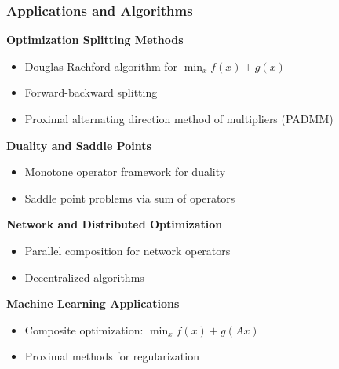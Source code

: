\documentclass[aspectratio=169,10pt]{beamer}
\begin{document}
\begin{frame}
  \frametitle{Applications and Algorithms}

  \textbf{Optimization Splitting Methods}
  \begin{itemize}
    \item Douglas-Rachford algorithm for $\min_x f(x) + g(x)$
    \item Forward-backward splitting
    \item Proximal alternating direction method of multipliers (PADMM)
  \end{itemize}

  \vspace{0.3cm}

  \textbf{Duality and Saddle Points}
  \begin{itemize}
    \item Monotone operator framework for duality
    \item Saddle point problems via sum of operators
  \end{itemize}

  \vspace{0.3cm}

  \textbf{Network and Distributed Optimization}
  \begin{itemize}
    \item Parallel composition for network operators
    \item Decentralized algorithms
  \end{itemize}

  \vspace{0.3cm}

  \textbf{Machine Learning Applications}
  \begin{itemize}
    \item Composite optimization: $\min_x f(x) + g(Ax)$
    \item Proximal methods for regularization
  \end{itemize}

\end{frame}
\end{document}
